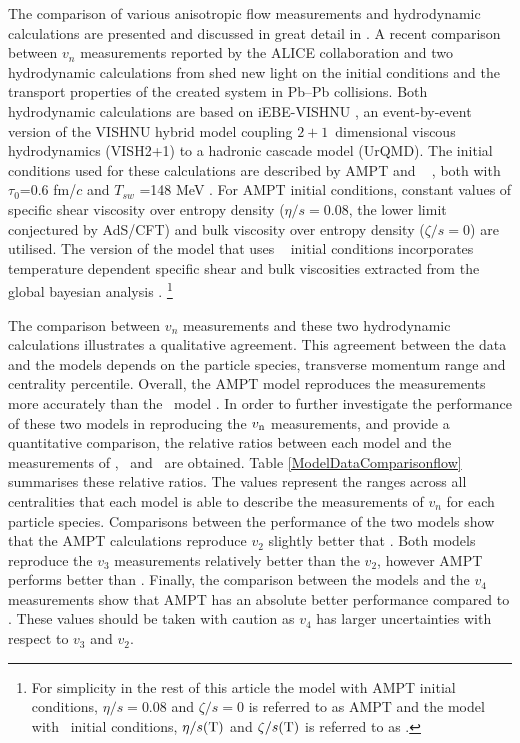 The comparison of various anisotropic flow measurements and hydrodynamic calculations are presented and discussed in great detail in \cite{Xu:2016hmp, McDonald:2016vlt, Zhao:2017yhj}. A recent comparison between $v_{n}$ measurements reported by the ALICE collaboration \cite{Acharya:2018zuq} and two hydrodynamic calculations from \cite{Zhao:2017yhj} shed new light on the initial conditions and the transport properties of the created system in Pb--Pb collisions. Both hydrodynamic calculations are based on iEBE-VISHNU \cite{Shen:2014vra}, an event-by-event version of the VISHNU hybrid model \cite{Song:2010aq} coupling $2+1$~dimensional viscous hydrodynamics (VISH2+1) \cite{Song:2007fn} to a hadronic cascade model (UrQMD). The initial conditions used for these calculations are described by AMPT \cite{Lin:2004en} and \trento~ \cite{Moreland:2014oya}, both with $\tau_{0}$=0.6 fm/$c$ and $T_{sw}$ =148 MeV \cite{Bernhard:2016tnd}. For AMPT initial conditions, constant values of specific shear viscosity over entropy density ($\eta/s =0.08$, the lower limit conjectured by AdS/CFT) and bulk viscosity over entropy density ($\zeta/s = 0$) are utilised. The version of the model that uses \trento~ \cite{Moreland:2014oya} initial conditions incorporates temperature dependent specific shear and bulk viscosities extracted from the global bayesian analysis \cite{Bernhard:2016tnd}. \footnote{ For simplicity in the rest of this article the model with AMPT initial conditions, $\eta/s =0.08$ and $\zeta/s =0$ is referred to as AMPT and the model with \trento~initial conditions, $\eta/s(\rm{T})$ and $\zeta/s(\rm{T})$ is referred to as \trento.} 

The comparison between $v_{n}$ measurements and these two hydrodynamic calculations illustrates a qualitative agreement. This agreement between the data and the models depends on the particle species, transverse momentum range and centrality percentile. Overall, the AMPT model reproduces the measurements more accurately than the \trento~model \cite{Acharya:2018zuq}. In order to further investigate the performance of these two models in reproducing the $v_{\rm n}$ measurements, and provide a quantitative comparison, the relative ratios between each model and the measurements of \pion, \kaon~and \proton~are obtained. Table \ref{ModelDataComparisonflow} summarises these relative ratios. The values represent the ranges across all centralities that each model is able to describe the measurements of $v_n$ for each particle species. Comparisons between the performance of the two models show that the AMPT calculations reproduce $v_{2}$ slightly better that \trento. Both models reproduce the $v_{3}$ measurements relatively better than the $v_{2}$, however AMPT performs better than \trento. Finally, the comparison between the models and the $v_{4}$ measurements show that AMPT has an absolute better performance compared to \trento. These values should be taken with caution as $v_{4}$ has larger uncertainties with respect to $v_{3}$ and $v_{2}$. 

